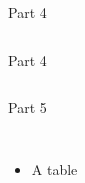 \documentclass[usenames,dvipsnames,aspectratio=169]{beamer}
\begin{document}
\begin{frame}{Part 4}
\label{P4}

\vspace*{-0.857cm}
\begin{columns}[t]
        \methodologyFig
    
    
        \begin{block}{Part 4}
    
    \end{block}
\end{columns}

\end{frame}
\begin{frame}{Part 5}
\label{P5}

\vspace*{-0.765cm}
\begin{columns}[t]
        \methodologyFig
    
    

        \small{
            \begin{itemize}
                \item A table
            \end{itemize}
            
            
        }
       
    \end{columns}

\end{frame}
\end{document}
